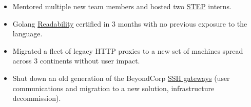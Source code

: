\documentclass[a4paper,sans,colorlinks]{moderncv}
\begin{document}
{\begin{itemize}
\begin{itemize}
\item
the Google
\href{https://storage.googleapis.com/pub-tools-public-publication-data/pdf/44860.pdf}{device inventory}
using Bigtable,
\item the service mananging all of Google's network level ACLs.
\end{itemize}
\item Mentored multiple new team members and hosted two
\href{https://careers.google.com/students/engineering-and-technical-internships/}{STEP} interns.
\item
Golang \href{https://sback.it/publications/icse2018seip.pdf}{Readability}
certified in 3 months with no previous exposure to the language.
\item
 Migrated a fleet of legacy HTTP proxies to a new set of machines
spread across 3 continents without user impact.
\item
Shut down an old generation of the BeyondCorp
\href{https://storage.googleapis.com/pub-tools-public-publication-data/pdf/45728.pdf}{SSH gateways}
(user communications and migration to a new solution,
infrastructure decommission).
\end{itemize}
}
\end{document}
